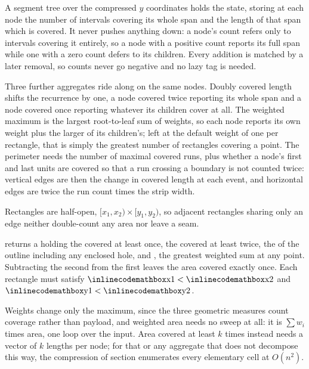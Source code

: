 A segment tree over the compressed $y$ coordinates holds the state, storing at each node the number of intervals covering its whole span and the length of that span which is covered. It never pushes anything down: a node's count refers only to intervals covering it entirely, so a node with a positive count reports its full span while one with a zero count defers to its children. Every addition is matched by a later removal, so counts never go negative and no lazy tag is needed.

Three further aggregates ride along on the same nodes. Doubly covered length shifts the recurrence by one, a node covered twice reporting its whole span and a node covered once reporting whatever its children cover at all. The weighted maximum is the largest root-to-leaf sum of weights, so each node reports its own weight plus the larger of its children's; left at the default weight of one per rectangle, that is simply the greatest number of rectangles covering a point. The perimeter needs the number of maximal covered runs, plus whether a node's first and last units are covered so that a run crossing a boundary is not counted twice: vertical edges are then the change in covered length at each event, and horizontal edges are twice the run count times the strip width.

Rectangles are half-open, $[x_1, x_2) \times [y_1, y_2)$, so adjacent rectangles sharing only an edge neither double-count any area nor leave a seam.

\begin{compactitem}
  \item {} returns a  holding the  covered at least once, the  covered at least twice, the  of the outline including any enclosed hole, and , the greatest weighted sum at any point. Subtracting the second from the first leaves the area covered exactly once. Each rectangle must satisfy ${\inlinecodemath{x1}} < {\inlinecodemath{x2}}$ and ${\inlinecodemath{y1}} < {\inlinecodemath{y2}}$.
\end{compactitem}

Weights change only the maximum, since the three geometric measures count coverage rather than payload, and weighted area needs no sweep at all: it is $\sum w_i$ times area, one loop over the input. Area covered at least $k$ times instead needs a vector of $k$ lengths per node; for that or any aggregate that does not decompose this way, the compression of section  enumerates every elementary cell at $O(n^{2})$.

